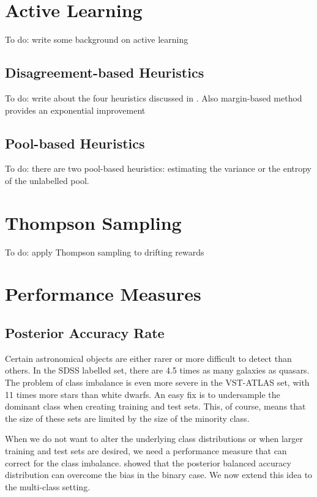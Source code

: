\section{Active Learning}

To do: write some background on active learning \cite{hanneke14}

\subsection{Disagreement-based Heuristics}
To do: write about the four heuristics discussed in \cite{schein07}. Also margin-based method
provides an exponential improvement \cite{balcan12}


\subsection{Pool-based Heuristics}
To do: there are two pool-based heuristics: estimating the variance or the entropy of the
unlabelled pool.



\section{Thompson Sampling}

To do: apply Thompson sampling to drifting rewards \cite{gupta11}



\section{Performance Measures}
\label{sec:measures}

\subsection{Posterior Accuracy Rate}
Certain astronomical objects are either rarer or more difficult to detect than others.
In the SDSS labelled set, there are 4.5 times as many galaxies as quasars. The problem
of class imbalance is even more severe in the VST-ATLAS set, with 11 times more stars than
white dwarfs. An easy fix is to undersample the dominant class when creating training and
test sets. This, of course, means that the size of these sets are limited by the size
of the minority class.

When we do not want to alter the underlying class distributions or when larger training and test
sets are desired, we need a performance measure that can correct for the class imbalance.
 showed that the posterior balanced accuracy distribution can overcome
the bias in the binary case. We now extend this idea to the multi-class setting.

